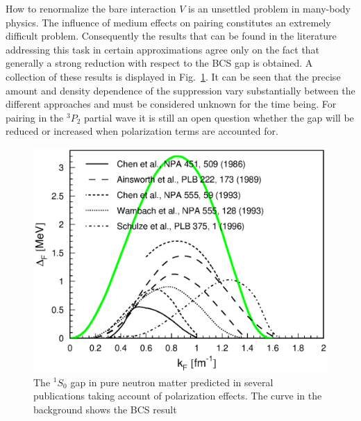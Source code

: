 \documentclass{svmult}
\def\ss{^1\!S_0}
\begin{document}
How to renormalize the bare interaction $V$ is an 
unsettled problem in many-body physics.
The influence of medium effects on pairing
constitutes an extremely difficult problem.
Consequently the results that can be found in the literature 
\cite{CHEN93,CLARK1,CHEN86,AINS89,WAMBACH,SCHU}
addressing this task in certain approximations agree only on the fact that
generally a strong reduction with respect to the BCS gap is obtained.
A collection of these results is displayed in Fig.~\ref{f:polgap}. 
It can be seen that the precise amount and density dependence of the 
suppression vary substantially between the different approaches 
and must be considered unknown for the time being. 
For pairing in the $^3P_2$ partial wave it is still an open question
whether the gap will be reduced or increased when polarization terms
are accounted for.
\begin{figure}[b] %
\includegraphics[height=.4\textheight,bb=40 380 40 690]{nsbk_pol.ps}
\caption[]
{The $\ss$ gap in pure neutron matter predicted in several publications
taking account of polarization effects.
The curve in the background shows the BCS result}
\label{f:polgap}
\end{figure} %
\end{document}
